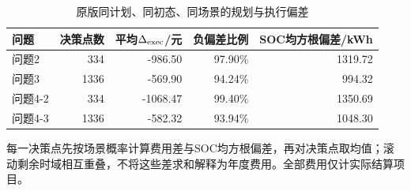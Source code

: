 \begin{table}[htbp]\centering\small
\caption{原版同计划、同初态、同场景的规划与执行偏差}
\label{tab:v2_execution_gap}
\begin{tabularx}{\linewidth}{LRRRR}\toprule
问题 & 决策点数 & 平均$\Delta_{\rm exec}$/元 & 负偏差比例 & SOC均方根偏差/kWh\\\midrule
问题2 & 334 & -986.50 & 97.90\% & 1319.72\\
问题3 & 1336 & -569.90 & 94.24\% & 994.32\\
问题4-2 & 334 & -1068.47 & 99.40\% & 1350.69\\
问题4-3 & 1336 & -582.32 & 93.94\% & 1048.30\\
\bottomrule\end{tabularx}
\par\smallskip\parbox{\linewidth}{\footnotesize 每一决策点先按场景概率计算费用差与SOC均方根偏差，再对决策点取均值；滚动剩余时域相互重叠，不将这些差求和解释为年度费用。全部费用仅计实际结算项目。}
\end{table}